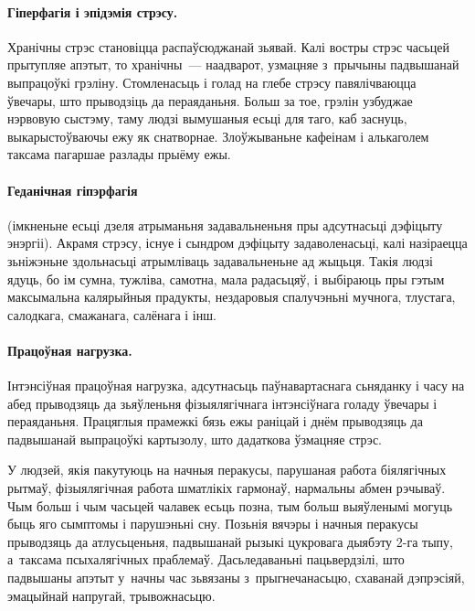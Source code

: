 \paragraph{Гіперфагія і эпідэмія стрэсу.}
Хранічны стрэс становіцца распаўсюджанай зьявай. Калі востры стрэс часьцей прытупляе апэтыт, то хранічны~--- наадварот, узмацняе з~прычыны падвышанай выпрацоўкі грэліну. Стомленасьць і голад на глебе стрэсу павялічваюцца ўвечары, што прыводзіць да пераяданьня. Больш за тое, грэлін узбуджае нэрвовую сыстэму, таму людзі вымушаныя есьці для таго, каб заснуць, выкарыстоўваючы ежу як снатворнае. Злоўжываньне кафеінам і алькаголем таксама пагаршае разлады прыёму ежы.

\paragraph{Геданічная гіпэрфагія} (імкненьне есьці дзеля атрыманьня задавальненьня пры адсутнасьці дэфіцыту энэргіі).
Акрамя стрэсу, існуе і сындром дэфіцыту задаволенасьці, калі назіраецца зьніжэньне здольнасьці атрымліваць задавальненьне ад жыцьця. Такія людзі ядуць, бо ім сумна, тужліва, самотна, мала радасьцяў, і выбіраюць пры гэтым максымальна калярыйныя прадукты, нездаровыя спалучэньні мучнога, тлустага, салодкага, смажанага, салёнага і інш.


\paragraph{Працоўная нагрузка.}
Інтэнсіўная працоўная нагрузка, адсутнасьць паўнавартаснага сьняданку і часу на абед прыводзяць да зьяўленьня фізыялягічнага інтэнсіўнага голаду ўвечары і пераяданьня. Працяглыя прамежкі бязь ежы раніцай і днём прыводзяць да падвышанай выпрацоўкі картызолу, што дадаткова ўзмацняе стрэс.

У людзей, якія пакутуюць на начныя перакусы, парушаная работа біялягічных рытмаў, фізыялягічная работа шматлікіх гармонаў, нармальны абмен рэчываў. Чым больш і чым часьцей чалавек есьць позна, тым больш выяўленымі могуць быць яго сымптомы і парушэньні сну. Позьнія вячэры і начныя перакусы прыводзяць да атлусьценьня, падвышанай рызыкі цукровага дыябэту 2-га тыпу, а~таксама псыхалягічных праблемаў. Дасьледаваньні пацьвердзілі, што падвышаны апэтыт у~начны час зьвязаны з~прыгнечанасьцю, схаванай дэпрэсіяй, эмацыйнай напругай, трывожнасьцю.

